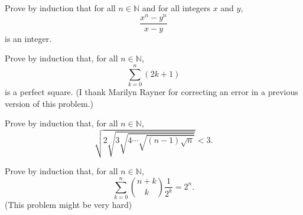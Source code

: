 \documentclass[12pt]{midterm}
\begin{document}
\begin{exam}
\begin{solution}\begin{solutiontext}
\end{solutiontext}\end{solution}

\begin{problem}[360]
Prove by induction that for all $n \in \mathbb{N}$ and for all integers $x$ and $y$,
$$
\frac{x^n - y^n}{x-y}
$$
is an integer.
\end{problem}

\begin{solution}\begin{solutiontext}
\end{solutiontext}\end{solution}

\begin{problem}[360]
Prove by induction that, for all $n \in \mathbb{N}$,
$$
\sum_{k=0}^n (2k+1)
$$
is a perfect square.  (I thank Marilyn Rayner for correcting an error in a previous version of this problem.)
\end{problem}

\begin{solution}\begin{solutiontext}
\end{solutiontext}\end{solution}

\begin{problem}[360]
Prove by induction that, for all $n \in \mathbb{N}$,
$$
\sqrt{2 \sqrt{3 \sqrt{4 \cdots \sqrt{(n-1) \sqrt{n}}}}} < 3.
$$
\end{problem}

\begin{solution}\begin{solutiontext}
\end{solutiontext}\end{solution}

\begin{problem}[360]
Prove by induction that, for all $n \in \mathbb{N}$,
$$
\sum_{k=0}^n \binom{n+k}{k} \frac{1}{2^k} = 2^n.
$$
(This problem might be very hard)
\end{problem}

\begin{solution}\begin{solutiontext}
\end{solutiontext}\end{solution}



\end{exam}
\end{document}
